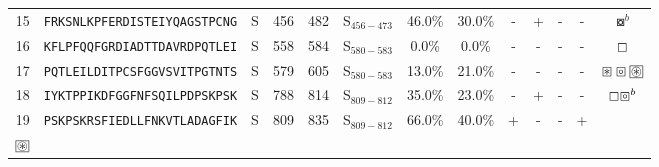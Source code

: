 \begin{tabular}{rcccccccccccc}
15 &  \texttt{FRKSNLKPFERDISTEIYQAGSTPCNG} &       S &    456 &   482 &  S$_{456-473}$ &                          46.0\% &                           30.0\% &          - &           + &          - &           - &                                                                                                    $ \boxcircle^b $ \\
16 &  \texttt{KFLPFQQFGRDIADTTDAVRDPQTLEI} &       S &    558 &   584 &  S$_{580-583}$ &                           0.0\% &                            0.0\% &          - &           - &          - &           - &                                                                                                       $ \boxempty $ \\
17 &  \texttt{PQTLEILDITPCSFGGVSVITPGTNTS} &       S &    579 &   605 &  S$_{580-583}$ &                          13.0\% &                           21.0\% &          - &           - &          - &           - &                                              $ \boxast \boxcircle \setlength{\fboxsep}{0.5pt} \boxed{\circledast} $ \\
18 &  \texttt{IYKTPPIKDFGGFNFSQILPDPSKPSK} &       S &    788 &   814 &  S$_{809-812}$ &                          35.0\% &                           23.0\% &          - &           + &          - &           - &                                                                                          $ \boxempty \boxcircle^b $ \\
19 &  \texttt{PSKPSKRSFIEDLLFNKVTLADAGFIK} &       S &    809 &   835 &  S$_{809-812}$ &                          66.0\% &                           40.0\% &          + &           - &          - &           + &  \Centerstack{  $\boxast \boxast^b \boxcircle \boxcircle^d$ \\  $\setlength{\fboxsep}{0.5pt} \boxed{\circledast}$ } \\
\bottomrule
\end{tabular}

